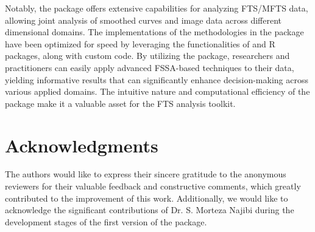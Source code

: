 Notably, the package offers extensive capabilities for analyzing FTS/MFTS data, 
allowing joint analysis of smoothed curves and image data across different 
dimensional domains. The implementations of the methodologies in the 
package have been optimized for speed by leveraging the functionalities of 
 and  R packages, along with custom 
 code. By utilizing the  package, researchers and 
practitioners can easily apply advanced FSSA-based techniques to their data, 
yielding informative results that can significantly enhance decision-making across 
various applied domains. The intuitive nature and computational efficiency of the 
package make it a valuable asset for the FTS analysis toolkit.

\section*{Acknowledgments}
The authors would like to express their sincere gratitude to the anonymous reviewers for their valuable feedback and constructive comments, which greatly contributed to the improvement of this work.
Additionally, we would like to acknowledge the significant contributions of Dr. S. Morteza Najibi during the development stages of the first version of the  package. 



\address{Hossein Haghbin\\
	Artificial Intelligence and Data Mining Research Group, ICT Research Institute \\
	Faculty of Intelligent Systems Engineering and Data Science, Persian Gulf University\\ Boushehr, Iran\\
	(ORCiD 0000-0001-8416-2354)\\
	}

\address{Jordan Trinka\\
  Department of Mathematical and Statistical Sciences, Marquette University,\\
  Wisconsin, USA\\
  (ORCiD 0000-0001-9118-5781)\\
  }


\address{Mehdi Maadooliat\\
  Department of Mathematical and Statistical Sciences, Marquette University,\\
  Wisconsin, USA\\
  (ORCiD: 0000-0002-5408-2676)\\
  }

